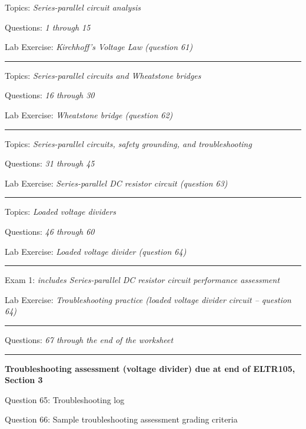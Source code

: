\hskip 10pt Topics: {\it Series-parallel circuit analysis}
 
\hskip 10pt Questions: {\it 1 through 15}
 
\hskip 10pt Lab Exercise: {\it Kirchhoff's Voltage Law (question 61)}
 
\vskip 10pt
\hrule \vskip 5pt
\noindent
{}

\hskip 10pt Topics: {\it Series-parallel circuits and Wheatstone bridges}
 
\hskip 10pt Questions: {\it 16 through 30}
 
\hskip 10pt Lab Exercise: {\it Wheatstone bridge (question 62)}
 
\vskip 10pt
\hrule \vskip 5pt
\noindent
{}

\hskip 10pt Topics: {\it Series-parallel circuits, safety grounding, and troubleshooting}
 
\hskip 10pt Questions: {\it 31 through 45}
 
\hskip 10pt Lab Exercise: {\it Series-parallel DC resistor circuit (question 63)}
 
\vskip 10pt
\hrule \vskip 5pt
\noindent
{}

\hskip 10pt Topics: {\it Loaded voltage dividers}
 
\hskip 10pt Questions: {\it 46 through 60}
 
\hskip 10pt Lab Exercise: {\it Loaded voltage divider (question 64)}
 
\vskip 10pt
\hrule \vskip 5pt
\noindent
{}

\hskip 10pt Exam 1: {\it includes Series-parallel DC resistor circuit performance assessment}
 
\hskip 10pt Lab Exercise: {\it Troubleshooting practice (loaded voltage divider circuit -- question 64)}
 
\vskip 10pt
\hrule \vskip 5pt
\noindent
{}

\hskip 10pt Questions: {\it 67 through the end of the worksheet}
 
\vskip 10pt
\hrule \vskip 5pt
\noindent
{}

\hskip 10pt {\bf Troubleshooting assessment (voltage divider) due at end of ELTR105, Section 3}
 
\hskip 10pt Question 65: Troubleshooting log
 
\hskip 10pt Question 66: Sample troubleshooting assessment grading criteria
 
